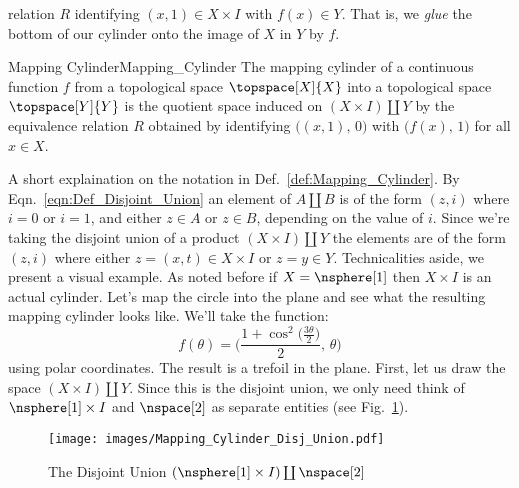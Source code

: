 \documentclass[oneside]{book}                                                  %
\begin{document}
                relation $R$ identifying $(x,1)\in{X}\times{I}$ with
                $f(x)\in{Y}$. That is, we \textit{glue} the bottom of our
                cylinder onto the image of $X$ in $Y$ by $f$.
                \begin{fdefinition}{Mapping Cylinder}{Mapping_Cylinder}
                    The mapping cylinder of a continuous function $f$ from a
                    topological space $\topspace[X]{X}$ into a topological space
                    $\topspace[Y]{Y}$ is the quotient space induced on
                    $(X\times{I})\coprod{Y}$ by the equivalence relation $R$
                    obtained by identifying $\big((x,1),\,0\big)$ with
                    $\big(f(x),\,1\big)$ for all $x\in{X}$.
                \end{fdefinition}
                A short explaination on the notation in
                Def.~\ref{def:Mapping_Cylinder}. By
                Eqn.~\ref{eqn:Def_Disjoint_Union} an element of $A\coprod{B}$ is
                of the form $(z,i)$ where $i=0$ or $i=1$, and either $z\in{A}$
                or $z\in{B}$, depending on the value of $i$. Since we're taking
                the disjoint union of a product $(X\times{I})\coprod{Y}$ the
                elements are of the form $(z,i)$ where either
                $z=(x,t)\in{X}\times{I}$ or $z=y\in{Y}$. Technicalities aside,
                we present a visual example. As noted before if $X=\nsphere[1]$
                then $X\times{I}$ is an actual cylinder. Let's map the circle
                into the plane and see what the resulting mapping cylinder looks
                like. We'll take the function:
                \begin{equation}
                    \label{eqn:Trefoil_Mapping_Cylinder}%
                    f(\theta)=\Big(
                        \frac{1+\cos^{2}\big(\frac{3\theta}{2}\big)}{2},\,
                        \theta
                    \Big)
                \end{equation}
                using polar coordinates. The result is a trefoil in the plane.
                First, let us draw the space $(X\times{I})\coprod{Y}$. Since
                this is the disjoint union, we only need think of
                $\nsphere[1]\times{I}$ and $\nspace[2]$ as separate entities
                (see Fig.~\ref{fig:Ex_Mapping_Cylinder_Disj_Union}).
                \begin{figure}[H]
                    \centering
                    \captionsetup{type=figure}
                    \texttt{[image: images/Mapping\_Cylinder\_Disj\_Union.pdf]}
                    \caption{The Disjoint Union
                             $(\nsphere[1]\times{I})\coprod\nspace[2]$}
                    \label{fig:Ex_Mapping_Cylinder_Disj_Union}
                \end{figure}
\end{document}
